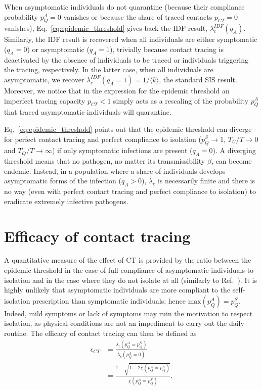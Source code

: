 \documentclass[aps,twocolumn,superscriptaddress,nofootinbib,pre,floatfix]{revtex4-1}
\begin{document}
When asymptomatic individuals do not quarantine (because their
compliance probability $p_Q^A = 0$ vanishes or because the share of
traced contacts $p_{CT} = 0$ vanishes), Eq.~\eqref{eq:epidemic_threshold}
gives back the IDF result, $\lambda_c^{IDF}(q_A)$.
Similarly, the IDF result is recovered when all individuals are
either symptomatic ($q_A = 0$) or asymptomatic ($q_A = 1$), trivially
because contact tracing is deactivated by the absence of individuals to be
traced or individuals triggering the tracing, respectively.
In the latter case, when all individuals are asymptomatic,
we recover $\lambda_c^{IDF}(q_A=1) = 1/\langle k \rangle$, the standard SIS result.
Moreover, we notice that in the expression for the
epidemic threshold an imperfect tracing capacity $p_{CT} < 1$ simply
acts as a rescaling of the probability $p_Q^A$ that traced
asymptomatic individuals will quarantine.

Eq.~\eqref{eq:epidemic_threshold} points out that
the epidemic threshold can diverge for perfect contact tracing and perfect compliance to isolation
($p_Q^S \to 1$, $T_U/T \to 0$ and $T_Q/T \to \infty$)
if only symptomatic infections are present ($q_A = 0$).
A diverging threshold means that no pathogen,
no matter its transmissibility $\beta$, can become endemic.
Instead, in a population where a share of individuals
develops asymptomatic forms of the infection ($q_A>0$),
$\lambda_c$ is necessarily finite and there is no way
(even with perfect contact tracing and perfect compliance to
isolation) to eradicate extremely infective pathogens.


\section{Efficacy of contact tracing}

A quantitative measure of the effect of CT is provided by
the ratio between the epidemic threshold in the case of full
compliance of asymptomatic individuals to isolation and in the case
where they do not isolate at all (similarly to Ref.~\cite{Heidecke}).
It is highly unlikely that asymptomatic individuals are more compliant to the
self-isolation prescription than symptomatic individuals; hence
$\text{max}(p_Q^A) = p_Q^S$.
Indeed, mild symptoms or lack of symptoms
may ruin the motivation to respect isolation, as physical conditions
are not an impediment to carry out the daily routine.
The efficacy of contact tracing can then be defined as
\begin{align}
    \epsilon_{CT} &= \frac{\lambda_c(p_Q^A = p_Q^S)}{\lambda_c(p_Q^A = 0)} \nonumber\\
    &= \frac{1 - \sqrt{1 - 2 \chi(p_Q^A = p_Q^S)}}{\chi(p_Q^A = p_Q^S)}.
    \label{epsilon}
\end{align}
\end{document}
